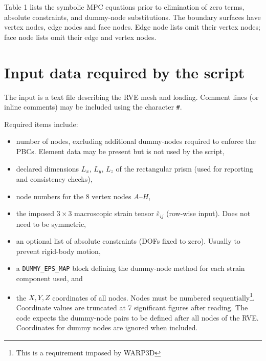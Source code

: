 \documentclass[11pt]{article}
\newcommand{\nid}{\noindent}
\begin{document}
Table 1 lists the symbolic MPC equations prior to elimination of 
zero terms, absolute constraints, and dummy-node substitutions. The
boundary surfaces have vertex nodes, edge nodes and face nodes. Edge node
lists omit their vertex nodes; face node lists omit their edge and vertex nodes.

\section{Input data required by the script}
The input is a text file describing the RVE mesh and loading. 
Comment lines (or inline comments) may be included using the character \texttt{\#}.

\nid Required items include:
\begin{itemize}
\item number of nodes, excluding additional dummy-nodes required to enforce the PBCs. 
Element data may be present but is not used by the script,
\item declared dimensions $L_x$, $L_y$, $L_z$ of the rectangular prism 
(used for reporting and consistency checks),
\item node numbers for the 8 vertex nodes $A$--$H$,
\item the imposed $3\times 3$ macroscopic strain tensor 
$\bar{\varepsilon}_{ij}$ (row-wise input). Does not need to be symmetric,
\item an optional list of absolute constraints (DOFs fixed to zero). Usually to prevent 
rigid-body motion,
\item a \texttt{DUMMY\_EPS\_MAP} block defining the dummy-node method for 
each strain component used, and
\item the $X,Y,Z$ coordinates of all nodes. Nodes must be numbered 
sequentially\footnote{This is a requirement imposed by WARP3D}. 
Coordinate values are truncated 
at 7 significant figures after reading. The code expects the dummy-node pairs
to be defined after all nodes of the RVE. Coordinates
for dummy nodes are ignored when included.
\end{itemize}
\end{document}
